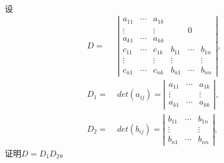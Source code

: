 \paragraph{}
设
\begin{align*}
  D =&\; \left|\begin{array}{cccccc}
    a_{11} & \cdots & a_{1k} & & & \\
    \vdots & & \vdots & & 0 & \\
    a_{k1} & \cdots & a_{kk} & & & \\
    c_{11} & \cdots & c_{1k} & b_{11} & \cdots & b_{1n} \\
    \vdots & & \vdots & \vdots & & \vdots \\
    c_{n1} & \cdots & c_{nk} & b_{n1} & \cdots & b_{nn}
  \end{array} \right|, \\
  D_1 =&\; det(a_{ij}) = \left|\begin{array}{ccc}
    a_{11} & \cdots & a_{1k} \\
    \vdots &  & \vdots \\
    a_{k1} & \cdots & a_{kk}
  \end{array} \right|, \\
  D_2 =&\; det(b_{ij}) = \left|\begin{array}{ccc}
    b_{11} & \cdots & b_{1n} \\
    \vdots &  & \vdots \\
    b_{n1} & \cdots & b_{nn}
  \end{array} \right|,
\end{align*}
证明$D=D_1D_2$。

